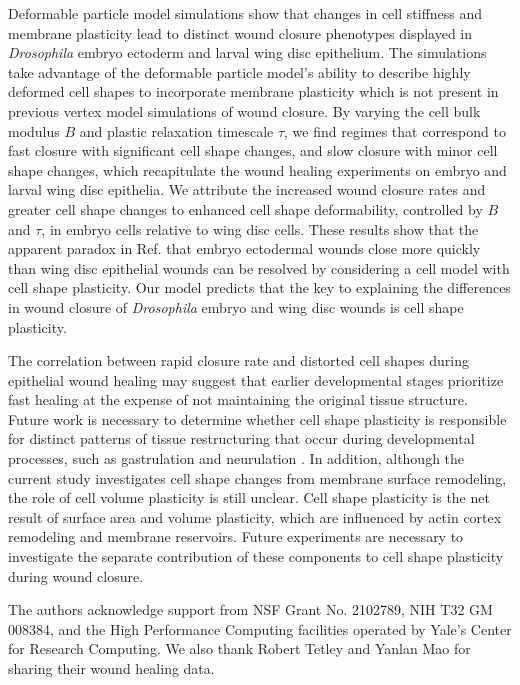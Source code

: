 \documentclass[%
 reprint,
superscriptaddress,
amsmath,amssymb,
prl,
floatfix,
]{revtex4-2}
\begin{document}
Deformable particle model simulations show that changes in cell stiffness and membrane plasticity lead to distinct wound closure phenotypes displayed in \textit{Drosophila} embryo ectoderm and larval wing disc epithelium. The simulations take advantage of the deformable particle model's ability to describe highly deformed cell shapes to incorporate membrane plasticity which is not present in previous vertex model simulations of wound closure. By varying the cell bulk modulus $B$ and plastic relaxation timescale $\tau$, we find regimes that correspond to fast closure with significant cell shape changes, and slow closure with minor cell shape changes, which recapitulate the wound healing experiments on embryo and larval wing disc epithelia. We attribute the increased wound closure rates and greater cell shape changes to enhanced cell shape deformability, controlled by $B$ and $\tau$, in embryo cells relative to wing disc cells. These results show that the apparent paradox in Ref. \cite{tetley2019tissue} that embryo ectodermal wounds close more quickly than wing disc epithelial wounds can be resolved by considering a cell model with cell shape plasticity. Our model predicts that the key to explaining the differences in wound closure of \textit{Drosophila} embryo and wing disc wounds is cell shape plasticity.

The correlation between rapid closure rate and distorted cell shapes during epithelial wound healing may suggest that earlier developmental stages prioritize fast healing at the expense of not maintaining the original tissue structure. Future work is necessary to determine whether cell shape plasticity is responsible for distinct patterns of tissue restructuring that occur during developmental processes, such as gastrulation and neurulation \cite{solnica2012gastrulation,vijayraghavan2017mechanics}. In addition, although the current study investigates cell shape changes from membrane surface remodeling, the role of cell volume plasticity is still unclear. Cell shape plasticity is the net result of surface area and volume plasticity, which are influenced by actin cortex remodeling and membrane reservoirs. Future experiments are necessary to investigate the separate contribution of these components to cell shape plasticity during wound closure. 

The authors acknowledge support from NSF Grant No. 2102789, NIH T32 GM 008384, and the High Performance Computing facilities operated by Yale’s Center for Research Computing. We also thank Robert Tetley and Yanlan Mao for sharing their wound healing data.

\appendix

\end{document}
